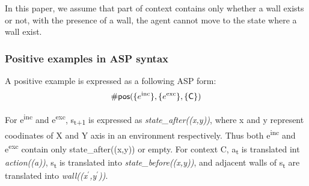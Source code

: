 In this paper, we assume that part of context contains only whether a wall exists or not, with the presence of a wall, the agent cannot move to the state where a wall exist.

\subsubsection{Positive examples in ASP syntax}
\label{subsubsec:positive_examples_asp_syntax}
A positive example is expressed as a following ASP form:
\begin{equation}
\begin{split}
    \textsf{\#pos}(\{e\textsuperscript{inc}\}, \{e\textsuperscript{exc}\}, \textsf{\{C\}})
\end{split}
\end{equation}

For e\textsuperscript{inc} and e\textsuperscript{exc}, s\textsubscript{t+1} is expressed as \textit{state\_after((x,y))}, where x and y represent coodinates of X and Y axis in an environment respectively.
Thus both e\textsuperscript{inc} and e\textsuperscript{exc} contain only state\_after((x,y)) or empty.
For context C, a\textsubscript{t} is translated int \textit{action((a))}, s\textsubscript{t} is translated into \textit{state\_before((x,y))}, and adjacent walls of s\textsubscript{t} are translated into \textit{wall((x$^\prime$,y$^\prime$))}.




